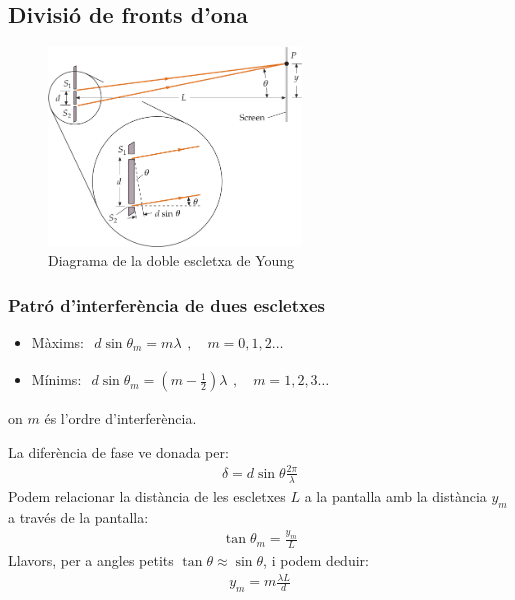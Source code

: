 \subsection{Divisió de fronts d'ona}
\begin{figure}[H]
\centering
    \includegraphics[width=0.6\textwidth]{images/6/64-int-doble.png}
\caption{Diagrama de la doble escletxa de Young}
\end{figure}
\subsubsection*{Patró d'interferència de dues escletxes}
\begin{itemize}
    \item Màxims: $\begin{gathered} \boxed{d \sin \theta_{m} = m \lambda} \end{gathered}, \quad m = 0, 1, 2 \dots$
    \item Mínims: $\begin{gathered} \boxed{d \sin \theta_{m} = (m - \frac{1}{2}) \lambda} \end{gathered}, \quad m = 1, 2, 3 \dots$
\end{itemize}
on $m$ és l'ordre d'interferència.

La diferència de fase ve donada per:
\begin{align} 
    \delta = d \sin \theta \frac{2 \pi}{\lambda} 
\end{align}
Podem relacionar la distància de les escletxes $L$ a la pantalla amb la distància $y_{m}$ a través de la pantalla:
\begin{align}
    \tan \theta_{m} = \frac{y_{m}}{L}
\end{align}
Llavors, per a angles petits $\tan \theta \approx \sin \theta$, i podem deduir:
\begin{align}
    \boxed{y_{m} = m \frac{\lambda L}{d}}
\end{align}

